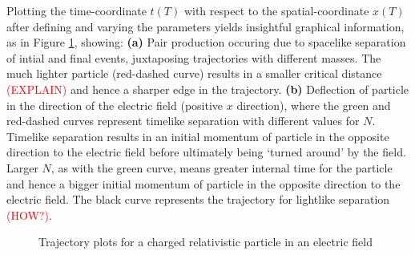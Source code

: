 \documentclass[12pt]{revtex4}
\newcommand{\red}{\textcolor{red}}
\begin{document}
Plotting the time-coordinate $t(T)$ with respect to the spatial-coordinate $x(T)$ after defining and varying the parameters yields insightful graphical information, as in Figure \ref{fig:trajects}, showing: \textbf{(a)} Pair production occuring due to spacelike separation of intial and final events, juxtaposing trajectories with different masses. The much lighter particle (red-dashed curve) results in a smaller critical distance \red{(EXPLAIN)} and hence a sharper edge in the trajectory. \textbf{(b)} Deflection of particle in the direction of the electric field (positive $x$ direction), where the green and red-dashed curves represent timelike separation with different values for $N$. Timelike separation results in an initial momentum of particle in the opposite direction to the electric field before ultimately being `turned around' by the field. Larger $N$, as with the green curve, means greater internal time for the particle and hence a bigger initial momentum of particle in the opposite direction to the electric field. The black curve represents the trajectory for lightlike separation \red{(HOW?)}.

\begin{figure}
	\centering
	\caption{Trajectory plots for a charged relativistic particle in an electric field}
	\label{fig:trajects}
\end{figure}
\end{document}
